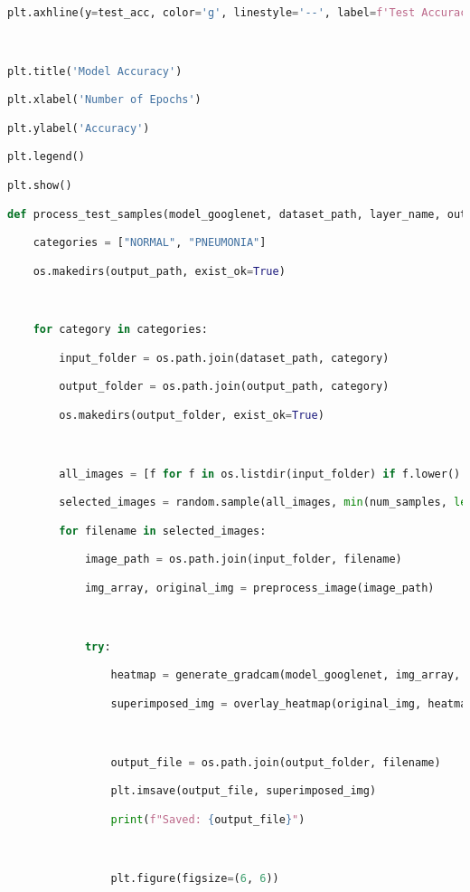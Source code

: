 \documentclass{article}
\begin{document}
\begin{lstlisting}[style=mystyle,language=Python]
plt.axhline(y=test_acc, color='g', linestyle='--', label=f'Test Accuracy: {test_acc:.2f}')



plt.title('Model Accuracy')

plt.xlabel('Number of Epochs')

plt.ylabel('Accuracy')

plt.legend()

plt.show()

def process_test_samples(model_googlenet, dataset_path, layer_name, output_path, num_samples=5):

    categories = ["NORMAL", "PNEUMONIA"]

    os.makedirs(output_path, exist_ok=True)



    for category in categories:

        input_folder = os.path.join(dataset_path, category)

        output_folder = os.path.join(output_path, category)

        os.makedirs(output_folder, exist_ok=True)



        all_images = [f for f in os.listdir(input_folder) if f.lower().endswith(('.jpg', '.jpeg', '.png'))]

        selected_images = random.sample(all_images, min(num_samples, len(all_images)))

        for filename in selected_images:

            image_path = os.path.join(input_folder, filename)

            img_array, original_img = preprocess_image(image_path)



            try:

                heatmap = generate_gradcam(model_googlenet, img_array, layer_name)

                superimposed_img = overlay_heatmap(original_img, heatmap)



                output_file = os.path.join(output_folder, filename)

                plt.imsave(output_file, superimposed_img)

                print(f"Saved: {output_file}")



                plt.figure(figsize=(6, 6))


\end{lstlisting}
\end{document}
